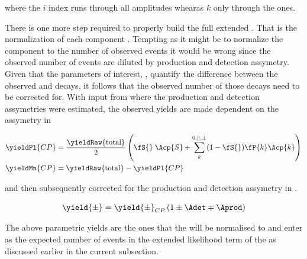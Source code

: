 \noindent where the $i$ index runs through all amplitudes whearas $k$ only through the \pwave ones.

There is one more step required to properly build the full extended \pdf. That is the normalization of each component \pdf. Tempting as it might be to 
normalize the component \pdfs to the number of observed events it would be wrong since the observed number of events are diluted by production and detection
assymetry. Given that the parameters of interest, \ACP, quantify the difference between the observed \BsbarJpsiKst and \BsJpsiKst decays, it follows that
the observed  number of those decays need to be corrected for. With input from  where the production and detection 
assymetries were estimated, the observed yields are made dependent on the \ACP assymetry in  

\begin{align}
\yieldPl{CP} &= \frac{ \yieldRaw{\text{total}} }{2} \left( \fS{}\; \Acp{S} + \sum_k^{0,\parallel,\perp} (1-\fS{})\fP{k}\Acp{k}  \right) \nonumber \\
\yieldMn{CP} &=  \yieldRaw{\text{total}} - \yieldPl{CP} 
\label{acp_yields}
\end{align}

\noindent and then subsequently corrected for the production and detection assymetry in . 

\begin{equation}
\yield{\pm} = \yield{\pm}_{CP}  \left( 1 \pm \Adet \mp \Aprod \right)
\label{norm_yields}
\end{equation}

\noindent The above parametric yields are the ones that the \pdfs will be normalised to and enter as the expected number of events in the extended
likelihood term of the \pdfs as discussed earlier in the current subsection. 
